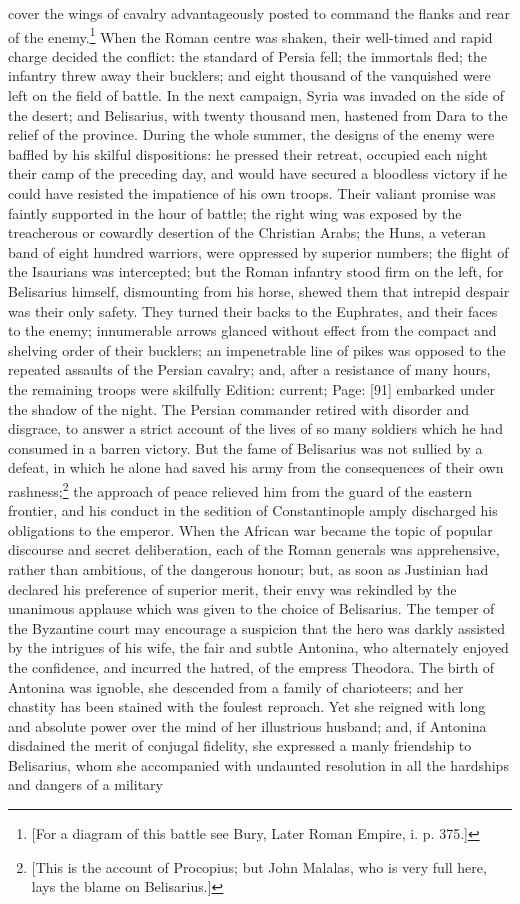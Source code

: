 cover the wings of cavalry advantageously posted to command the flanks and rear of the enemy.\footnote{[For a diagram of this battle see Bury, Later Roman Empire, i. p. 375.]} When the Roman centre was shaken, their well-timed and rapid charge decided the conflict: the standard of Persia fell; the immortals fled; the infantry threw away their bucklers; and eight thousand of the vanquished were left on the field of battle. In the next campaign, Syria was invaded on the side of the desert; and Belisarius, with twenty thousand men, hastened from Dara to the relief of the province. During the whole summer, the designs of the enemy were baffled by his skilful dispositions: he pressed their retreat, occupied each night their camp of the preceding day, and would have secured a bloodless victory if he could have resisted the impatience of his own troops. Their valiant promise was faintly supported in the hour of battle; the right wing was exposed by the treacherous or cowardly desertion of the Christian Arabs; the Huns, a veteran band of eight hundred warriors, were oppressed by superior numbers; the flight of the Isaurians was intercepted; but the Roman infantry stood firm on the left, for Belisarius himself, dismounting from his horse, shewed them that intrepid despair was their only safety. They turned their backs to the Euphrates, and their faces to the enemy; innumerable arrows glanced without effect from the compact and shelving order of their bucklers; an impenetrable line of pikes was opposed to the repeated assaults of the Persian cavalry; and, after a resistance of many hours, the remaining troops were skilfully Edition: current; Page: [91] embarked under the shadow of the night. The Persian commander retired with disorder and disgrace, to answer a strict account of the lives of so many soldiers which he had consumed in a barren victory. But the fame of Belisarius was not sullied by a defeat, in which he alone had saved his army from the consequences of their own rashness;\footnote{[This is the account of Procopius; but John Malalas, who is very full here, lays the blame on Belisarius.]} the approach of peace relieved him from the guard of the eastern frontier, and his conduct in the sedition of Constantinople amply discharged his obligations to the emperor. When the African war became the topic of popular discourse and secret deliberation, each of the Roman generals was apprehensive, rather than ambitious, of the dangerous honour; but, as soon as Justinian had declared his preference of superior merit, their envy was rekindled by the unanimous applause which was given to the choice of Belisarius. The temper of the Byzantine court may encourage a suspicion that the hero was darkly assisted by the intrigues of his wife, the fair and subtle Antonina, who alternately enjoyed the confidence, and incurred the hatred, of the empress Theodora. The birth of Antonina was ignoble, she descended from a family of charioteers; and her chastity has been stained with the foulest reproach. Yet she reigned with long and absolute power over the mind of her illustrious husband; and, if Antonina disdained the merit of conjugal fidelity, she expressed a manly friendship to Belisarius, whom she accompanied with undaunted resolution in all the hardships and dangers of a military 